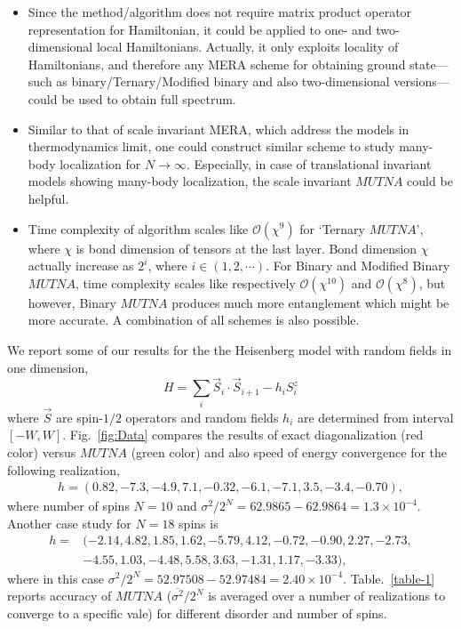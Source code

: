 \documentclass[aps,prb,twocolumn,groupedaddress,notitlepage,showpacs,floatfix,superscriptaddress]{revtex4-1}
\begin{document}
\begin{itemize}
\item Since the method/algorithm does not require matrix product operator representation for Hamiltonian, it could be applied to one- and two-dimensional local Hamiltonians. Actually, it only exploits locality of Hamiltonians, and therefore any MERA scheme for obtaining ground state---such as binary/Ternary/Modified binary and also two-dimensional versions---could be used to obtain full spectrum.    

\item Similar to that of scale invariant MERA, which address the models in thermodynamics limit, one could construct similar scheme to study many-body localization for $N\rightarrow \infty$. Especially, in case of translational invariant models showing many-body localization, the scale invariant $MUTNA$ could be helpful.

\item Time complexity of algorithm scales like $\mathcal{O}(\chi^{9})$ for `Ternary $MUTNA$', where $\chi$ is bond dimension of tensors at the last layer. Bond dimension $\chi$ actually increase as $2^{i}$, where $ i \in ( 1,2,\cdots )$. For Binary and Modified Binary $MUTNA$, time complexity scales like respectively $\mathcal{O}(\chi^{10})$ and $\mathcal{O}(\chi^{8})$, but however, Binary $MUTNA$ produces much more entanglement which might be more accurate. A combination of all schemes is also possible.       
\end{itemize} 

We report some of our results for the the Heisenberg model with random fields in one dimension,
\begin{equation*}
H= \sum_{i}\overrightarrow{S}_{i}\cdot\overrightarrow{S}_{i+1}-h_{i}S^{z}_{i}
\end{equation*}
where $\overrightarrow{S}$ are spin-$1/2$ operators and random fields $h_{i}$ are determined from interval $[-W,W]$. Fig.~\ref{fig:Data} compares the results of exact diagonalization (red color) versus $MUTNA$ (green color) and also speed of energy convergence for the following realization,
\begin{align*}
h=(0.82,-7.3,-4.9,7.1,-0.32,-6.1,-7.1,3.5,-3.4,-0.70),
\end{align*}
where number of spins $N=10$ and $\sigma^{2}/2^{N}=62.9865-62.9864=1.3\times10^{-4}$. Another case study for $N=18$ spins is 
\begin{align*}
h=&(-2.14,4.82,1.85,1.62,-5.79,4.12,-0.72,-0.90,2.27,-2.73, \\
&-4.55,1.03,-4.48,5.58,3.63,-1.31,1.17,-3.33),
\end{align*}
where in this case $\sigma^{2}/2^{N}=52.97508-52.97484=2.40\times10^{-4}$. Table.~\ref{table-1} reports accuracy of $MUTNA$ ($\overline{\sigma^{2}}/2^{N}$ is averaged over a number of realizations to converge to a specific vale) for different disorder and number of spins.
\end{document}
